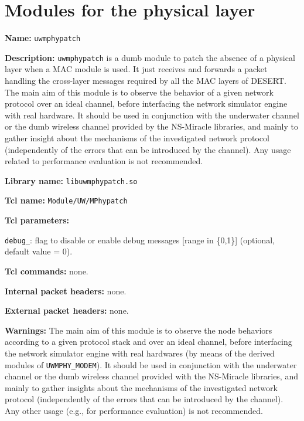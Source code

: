 \section{Modules for the physical layer}\label{sec:physical}

\begin{description}
   \item {\bf Name:} {\tt uwmphypatch}
   \item {\bf Description:} {\tt uwmphypatch} is a dumb module to patch the absence of a physical layer when a MAC module is used. It just receives and forwards a packet handling the cross-layer messages required by all the MAC layers of DESERT. The main aim of this module is to observe the behavior of a given network protocol over an ideal channel, before interfacing the network simulator engine with real hardware. It should be used in conjunction with the underwater channel or the dumb wireless channel provided by the NS-Miracle libraries, and mainly to gather insight about the mechanisms of the investigated network protocol (independently of the errors that can be introduced by the channel). Any usage related to performance evaluation is not recommended.
   \item {\bf Library name:} {\tt libuwmphypatch.so}
   \item {\bf Tcl name:} {\tt Module/UW/MPhypatch}
   \item {\bf Tcl parameters:} 
         \begin{description}
          \item {\tt debug\_}: flag to disable or enable debug messages [range in \{0,1\}] (optional, default value = 0).
         \end{description}
   \item {\bf Tcl commands:} none.
   \item {\bf Internal packet headers:} none. 
   \item {\bf External packet headers:} none.
   \item {\bf Warnings:} The main aim of this module is to observe the node behaviors according to a given protocol stack and over an ideal channel, before interfacing the network simulator engine with real hardwares (by means of the derived modules of {\tt UWMPHY\_MODEM}). It should be used in conjunction with the underwater channel or the dumb wireless channel provided with the NS-Miracle libraries, and mainly to gather insights about the mechanisms of the investigated network protocol (independently of the errors that can be introduced by the channel). Any other usage (e.g., for performance evaluation) is not recommended.

\end{description}
